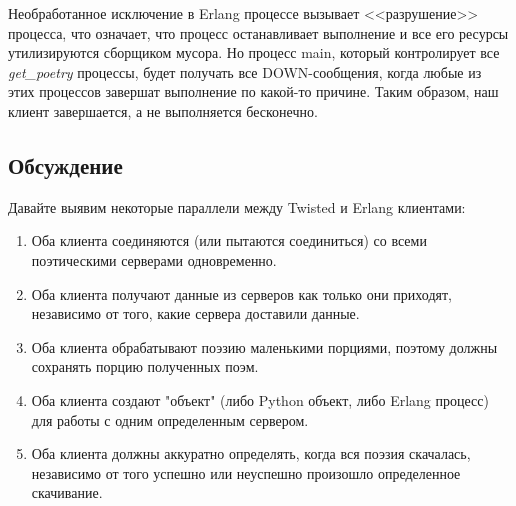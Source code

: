 Необработанное исключение в Erlang процессе вызывает 
<<разрушение>> процесса, что означает, что процесс останавливает 
выполнение и все его ресурсы утилизируются сборщиком мусора. 
Но процесс main, который контролирует все \textit{get\_poetry} 
процессы, будет получать все DOWN-сообщения, когда любые из 
этих процессов завершат выполнение по какой-то причине. 
Таким образом, наш клиент завершается, а не выполняется бесконечно. 

\subsection{Обсуждение}

Давайте выявим некоторые параллели между Twisted и Erlang клиентами:

\begin{enumerate}

\item Оба клиента соединяются (или пытаются соединиться) со всеми поэтическими серверами одновременно.

\item Оба клиента получают данные из серверов как только они приходят, 
независимо от того, какие сервера доставили данные.

\item Оба клиента обрабатывают поэзию маленькими порциями, поэтому должны 
сохранять порцию полученных поэм.

\item Оба клиента создают "объект" (либо Python объект, либо Erlang процесс) для 
работы с одним определенным сервером.

\item Оба клиента должны аккуратно определять, когда вся поэзия скачалась, 
независимо от того успешно или неуспешно произошло определенное скачивание.

\end{enumerate}


